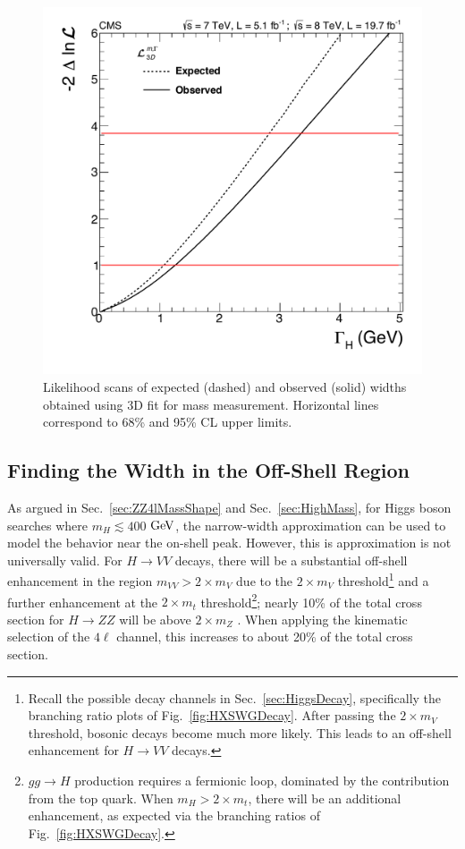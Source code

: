 \begin{figure}[htbp]
\begin{center}
\includegraphics[width=.7\linewidth]{HiggsProperties/figures/width_3D.pdf}
\caption[Direct Measurement of Higgs Width in $4\ell$ Decay Channel]{Likelihood scans of expected (dashed) and observed (solid) widths obtained using 3D fit for mass measurement. Horizontal lines correspond to 68\% and 95\% CL upper limits.}
\label{fig:DirectHiggsWidth}
\end{center}
\end{figure}

\subsection{Finding the Width in the Off-Shell Region}
\label{sec:OffShellPheno}

As argued in Sec.~\ref{sec:ZZ4lMassShape} and Sec.~\ref{sec:HighMass}, for Higgs boson searches where $m_H \lesssim 400$ $\rm{GeV}$, the narrow-width approximation can be used to model the behavior near the on-shell peak. However, this is approximation is not universally valid. For $H\rightarrow VV$ decays, there will be a substantial off-shell enhancement in the region $m_{VV} > 2\times m_{V}$ due to the $2\times m_{V}$ threshold\footnote{Recall the possible decay channels in Sec.~\ref{sec:HiggsDecay}, specifically the branching ratio plots of Fig.~\ref{fig:HXSWGDecay}. After passing the $2\times m_{V}$ threshold, bosonic decays become much more likely. This leads to an off-shell enhancement for $H\rightarrow VV$ decays.} and a further enhancement at the $2\times m_{t}$ threshold\footnote{$gg\rightarrow H$ production requires a fermionic loop, dominated by the contribution from the top quark. When $m_H > 2\times m_{t}$, there will be an additional enhancement, as expected via the branching ratios of Fig.~\ref{fig:HXSWGDecay}.}; nearly 10\% of the total cross section for $H\rightarrow ZZ$ will be above $2\times m_{Z}$ \cite{Kauer:2012hd,Kauer:1305.2092}. When applying the kinematic selection of the $4\ell$ channel, this increases to about 20\% of the total cross section. 

